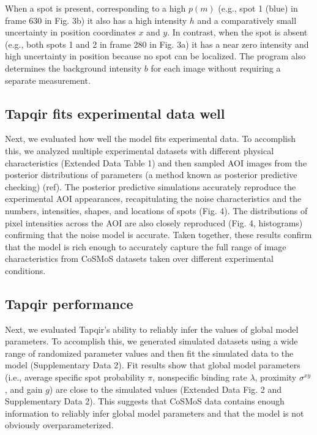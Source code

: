 When a spot is present, corresponding to a high $p(m)$ (e.g., spot 1 (blue) in frame 630 in Fig. 3b) it also has a high intensity $h$ and a comparatively small uncertainty in position coordinates $x$ and $y$. In contrast, when the spot is absent (e.g., both spots 1 and 2 in frame 280 in Fig. 3a) it has a near zero intensity and high uncertainty in position because no spot can be localized. The program also determines the background intensity $b$ for each image without requiring a separate measurement. 


\subsection*{Tapqir fits experimental data well}

Next, we evaluated how well the model fits experimental data. To accomplish this, we analyzed multiple experimental datasets with different physical characteristics (Extended Data Table 1) and then sampled AOI images from the posterior distributions of parameters (a method known as posterior predictive checking) (ref). The posterior predictive simulations accurately reproduce the experimental AOI appearances, recapitulating the noise characteristics and the numbers, intensities, shapes, and locations of spots (Fig. 4).  The distributions of pixel intensities across the AOI are also closely reproduced (Fig. 4, histograms) confirming that the noise model is accurate. Taken together, these results confirm that the model is rich enough to accurately capture the full range of image characteristics from CoSMoS datasets taken over different experimental conditions.

\subsection*{Tapqir performance}

Next, we evaluated Tapqir's ability to reliably infer the values of global model parameters. To  accomplish this, we generated simulated datasets  using  a wide range of randomized parameter values and then fit the simulated data to the model (Supplementary Data 2). Fit results show that global model parameters (i.e., average specific spot probability $\pi$, nonspecific binding rate $\lambda$, proximity $\sigma^{xy}$, and gain $g$) are close to the simulated values  (Extended Data Fig. 2 and Supplementary Data 2). This suggests that CoSMoS data contains enough information to reliably infer global model parameters and that the model is not obviously overparameterized.

